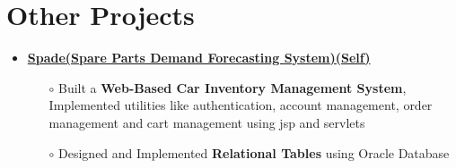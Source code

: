 \documentclass[10.8pt, a4paper]{extarticle}
\newcommand{\shorterSection}[1]{\vspace{-10pt}\section{#1}}
\begin{document}
\begin{itemize}
	


\medskip

\end{itemize}
\vspace{-2mm}


\shorterSection{Other Projects}
\vspace{-2pt}
\begin{itemize}
     \item\href{https://github.com/jeetsarangi/spade}{\textbf{Spade(Spare Parts Demand Forecasting System)(Self)}}\hfill
    \\[-0.6cm]
    \begin{itemize}
	      \item [$\circ$]Built a \textbf {Web-Based Car Inventory Management System}, Implemented utilities like authentication, account management, order management and cart management using jsp and servlets\\[-0.6cm]
	      \item [$\circ$] Designed and Implemented \textbf{Relational Tables} using Oracle Database
	\end{itemize}
	\end{itemize}
\medskip
\end{document}
